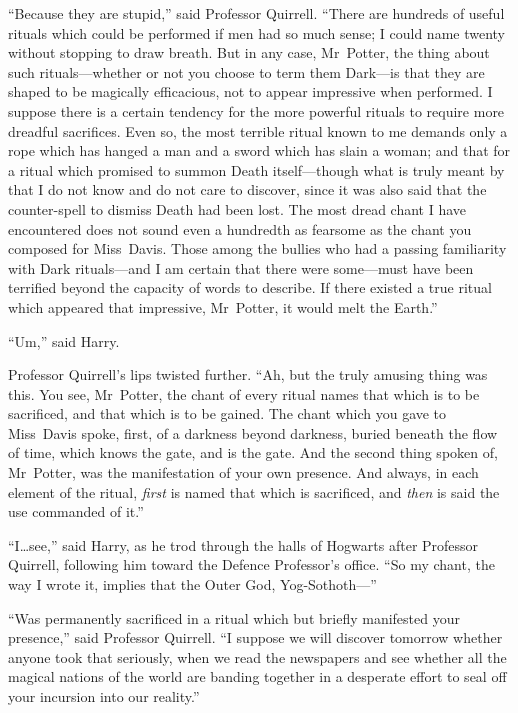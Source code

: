 “Because they are stupid,” said Professor Quirrell. “There are hundreds of useful rituals which could be performed if men had so much sense; I could name twenty without stopping to draw breath. But in any case, Mr~Potter, the thing about such rituals—whether or not you choose to term them Dark—is that they are shaped to be magically efficacious, not to appear impressive when performed. I suppose there is a certain tendency for the more powerful rituals to require more dreadful sacrifices. Even so, the most terrible ritual known to me demands only a rope which has hanged a man and a sword which has slain a woman; and that for a ritual which promised to summon Death itself—though what is truly meant by that I do not know and do not care to discover, since it was also said that the counter-spell to dismiss Death had been lost. The most dread chant I have encountered does not sound even a hundredth as fearsome as the chant you composed for Miss~Davis. Those among the bullies who had a passing familiarity with Dark rituals—and I am certain that there were some—must have been terrified beyond the capacity of words to describe. If there existed a true ritual which appeared that impressive, Mr~Potter, it would melt the Earth.”

“Um,” said Harry.

Professor Quirrell’s lips twisted further. “Ah, but the truly amusing thing was this. You see, Mr~Potter, the chant of every ritual names that which is to be sacrificed, and that which is to be gained. The chant which you gave to Miss~Davis spoke, first, of a darkness beyond darkness, buried beneath the flow of time, which knows the gate, and is the gate. And the second thing spoken of, Mr~Potter, was the manifestation of your own presence. And always, in each element of the ritual, \emph{first} is named that which is sacrificed, and \emph{then} is said the use commanded of it.”

“I…see,” said Harry, as he trod through the halls of Hogwarts after Professor Quirrell, following him toward the Defence Professor’s office. “So my chant, the way I wrote it, implies that the Outer God, Yog-Sothoth—”

“Was permanently sacrificed in a ritual which but briefly manifested your presence,” said Professor Quirrell. “I suppose we will discover tomorrow whether anyone took that seriously, when we read the newspapers and see whether all the magical nations of the world are banding together in a desperate effort to seal off your incursion into our reality.”

